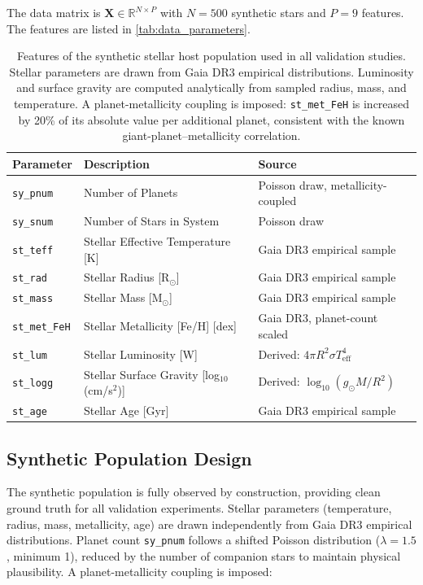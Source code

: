 \documentclass[preprint]{aastex631}
\begin{document}
The data matrix is $\mathbf{X} \in \mathbb{R}^{N \times P}$ with $N = 500$ synthetic stars and $P = 9$ features. The features are listed in \autoref{tab:data_parameters}.

\begin{table}
  \centering
  \begin{tabular}{lll}
    \hline
    \textbf{Parameter} & \textbf{Description} & \textbf{Source} \\
    \hline
    \verb|sy_pnum| & Number of Planets & Poisson draw, metallicity-coupled \\
    \verb|sy_snum| & Number of Stars in System & Poisson draw \\
    \verb|st_teff| & Stellar Effective Temperature [K] & Gaia DR3 empirical sample \\
    \verb|st_rad|  & Stellar Radius [R$_\odot$] & Gaia DR3 empirical sample \\
    \verb|st_mass| & Stellar Mass [M$_\odot$] & Gaia DR3 empirical sample \\
    \verb|st_met_FeH| & Stellar Metallicity [Fe/H] [dex] & Gaia DR3, planet-count scaled \\
    \verb|st_lum|  & Stellar Luminosity [W] & Derived: $4\pi R^2 \sigma T_{\text{eff}}^4$ \\
    \verb|st_logg| & Stellar Surface Gravity [log$_{10}$(cm/s$^2$)] & Derived: $\log_{10}(g_\odot M/R^2)$ \\
    \verb|st_age|  & Stellar Age [Gyr] & Gaia DR3 empirical sample \\
    \hline
  \end{tabular}
  \caption{Features of the synthetic stellar host population used in all validation studies. Stellar parameters are drawn from Gaia DR3 empirical distributions. Luminosity and surface gravity are computed analytically from sampled radius, mass, and temperature. A planet-metallicity coupling is imposed: \texttt{st\_met\_FeH} is increased by 20\% of its absolute value per additional planet, consistent with the known giant-planet--metallicity correlation.}
  \label{tab:data_parameters}
\end{table}

\subsection{Synthetic Population Design}

The synthetic population is fully observed by construction, providing clean ground truth for all validation experiments. Stellar parameters (temperature, radius, mass, metallicity, age) are drawn independently from Gaia DR3 empirical distributions. Planet count \texttt{sy\_pnum} follows a shifted Poisson distribution ($\lambda = 1.5$, minimum 1), reduced by the number of companion stars to maintain physical plausibility. A planet-metallicity coupling is imposed:
\end{document}
